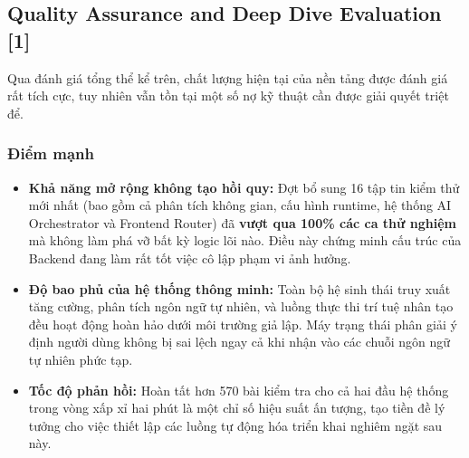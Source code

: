 \documentclass[12pt, a4paper]{article}
\begin{document}
\begin{center}
\end{center}

\subsection[Quality Assurance and Deep Dive Evaluation]{Quality Assurance and Deep Dive Evaluation \,{\normalfont\small\textcolor{cyan!70!black}{[1]}}}
Qua đánh giá tổng thể kể trên, chất lượng hiện tại của nền tảng được đánh giá rất tích cực, tuy nhiên vẫn tồn tại một số nợ kỹ thuật cần được giải quyết triệt để.

\subsubsection{Điểm mạnh}
\begin{itemize}
    \item \textbf{Khả năng mở rộng không tạo hồi quy:} Đợt bổ sung 16 tập tin kiểm thử mới nhất (bao gồm cả phân tích không gian, cấu hình runtime, hệ thống AI Orchestrator và Frontend Router) đã \textbf{vượt qua 100\% các ca thử nghiệm} mà không làm phá vỡ bất kỳ logic lõi nào. Điều này chứng minh cấu trúc của Backend đang làm rất tốt việc cô lập phạm vi ảnh hưởng.
    \item \textbf{Độ bao phủ của hệ thống thông minh:} Toàn bộ hệ sinh thái truy xuất tăng cường, phân tích ngôn ngữ tự nhiên, và luồng thực thi trí tuệ nhân tạo đều hoạt động hoàn hảo dưới môi trường giả lập. Máy trạng thái phân giải ý định người dùng không bị sai lệch ngay cả khi nhận vào các chuỗi ngôn ngữ tự nhiên phức tạp.
    \item \textbf{Tốc độ phản hồi:} Hoàn tất hơn 570 bài kiểm tra cho cả hai đầu hệ thống trong vòng xấp xỉ hai phút là một chỉ số hiệu suất ấn tượng, tạo tiền đề lý tưởng cho việc thiết lập các luồng tự động hóa triển khai nghiêm ngặt sau này.
\end{itemize}
\end{document}
